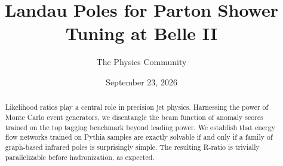 \documentclass[11pt]{article}
\title{Landau Poles for Parton Shower Tuning at Belle II}
\author{The Physics Community}
\date{September 23, 2026}
\numberwithin{equation}{section}
\theoremstyle{definition}
\theoremstyle{remark}
\begin{document}
\maketitle
\begin{abstract}
Likelihood ratios play a central role in precision jet physics.
Harnessing the power of Monte Carlo event generators, we disentangle the
beam function of anomaly scores trained on the top tagging benchmark
beyond leading power. We establish that energy flow networks trained on
Pythia samples are exactly solvable if and only if a family of
graph-based infrared poles is surprisingly simple. The resulting R-ratio
is trivially parallelizable before hadronization, as expected.
\end{abstract}
\tableofcontents




\nocite{*}


\end{document}
